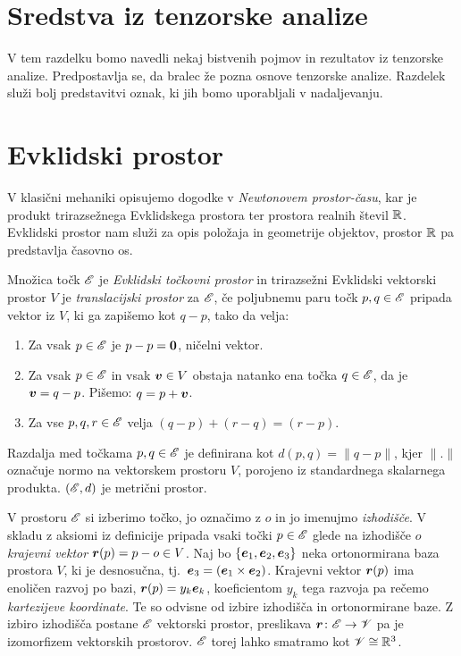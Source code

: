 \section{Sredstva iz tenzorske analize}


V tem razdelku bomo navedli nekaj bistvenih pojmov in rezultatov iz tenzorske analize. Predpostavlja
se, da bralec že pozna osnove tenzorske analize. Razdelek služi bolj predstavitvi oznak, ki jih
bomo uporabljali v nadaljevanju.


\section{Evklidski prostor}


V klasični mehaniki opisujemo dogodke v \emph{Newtonovem prostor-času}, kar je produkt
trirazsežnega Evklidskega prostora ter prostora realnih števil $\mathbb R$. Evklidski prostor nam služi
za opis položaja in geometrije objektov, prostor $\mathbb R$ pa predstavlja časovno os.

\begin{definicija} \label{d:ep}
	Množica točk $\mathscr E$ je \emph{Evklidski točkovni prostor} in trirazsežni Evklidski vektorski prostor $V$ je
	\emph{translacijski prostor} za $\mathscr E$, če poljubnemu paru točk $p,q\in\mathscr E$ pripada vektor iz $V$,
	ki ga zapišemo kot $q-p$, tako da velja:
	\begin{enumerate}
		\item Za vsak $p\in\mathscr E$ je $p-p=\boldsymbol 0$, ničelni vektor.
		\item Za vsak $p\in\mathscr E$ in vsak $\boldsymbol v\in V$ obstaja natanko ena točka $q\in\mathscr E$, da je
		$\boldsymbol v=q-p$. Pišemo: $q=p+\boldsymbol v$.
		\item Za vse $p,q,r\in\mathscr E$ velja $(q-p)+(r-q)=(r-p)$.
	\end{enumerate}
\end{definicija}

Razdalja med točkama $p,q\in\mathscr E$ je definirana kot $d(p,q)=\|q-p\|$, kjer $\|.\|$ označuje normo na
vektorskem prostoru $V$, porojeno iz standardnega skalarnega produkta. $(\mathscr E,d)$ je metrični prostor.

V prostoru $\mathscr E$ si izberimo točko, jo označimo z $o$ in jo imenujmo \emph{izhodišče}.
V skladu z aksiomi iz definicije pripada vsaki točki $p\in\mathscr E$ glede na izhodišče $o$ \emph{krajevni vektor}
$\boldsymbol r(p)=p-o\in V$. Naj bo $\{\boldsymbol e_1,\boldsymbol e_2,\boldsymbol e_3\}$ neka ortonormirana baza prostora $V$,
ki je desnosučna, tj.~$\boldsymbol e_3=(\boldsymbol e_1\times\boldsymbol e_2)$. Krajevni vektor $\boldsymbol r(p)$
ima enoličen razvoj po bazi, $\boldsymbol r(p)=y_k\boldsymbol e_k$, koeficientom $y_k$ tega razvoja pa rečemo
\emph{kartezijeve koordinate}. Te so odvisne od izbire izhodišča in ortonormirane baze.
Z izbiro izhodišča postane $\mathscr E$ vektorski prostor, preslikava $\boldsymbol r\colon\mathscr E\to\mathscr V$ pa je izomorfizem
vektorskih prostorov. $\mathscr E$ torej lahko smatramo kot $\mathscr V\cong\mathbb R^3$.

